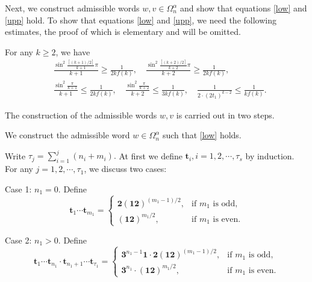 \documentclass[reqno,11pt,graphicx,]{amsart}
\numberwithin{equation}{section}
\theoremstyle{plain}
\newcommand{\3}{\mathbf{3}}
\begin{document}
	Next, we construct admissible words $w,v\in\Omega^{\alpha}_{n}$ and show that equations \eqref{low} and \eqref{upp} hold. To show that equations \eqref{low} and \eqref{upp}, we need the following estimates, the proof of which is elementary
	and will be omitted.
	
	For any $k\geq2$, we have 
	\begin{align}
		&\frac{\sin^2\frac{[(k+1)/2]}{k+1}\pi}{k+1}\geq\frac{1}{2kf(k)},\quad \frac{\sin^2\frac{[(k+2)/2]}{k+2}\pi}{k+2}\geq\frac{1}{2kf(k)},\label{imp-1}\\
		&\frac{\sin^2\frac{\pi}{k+1}}{k+1}\leq\frac{1}{2kf(k)},\quad \frac{\sin^2\frac{\pi}{k+2}}{k+2}\leq\frac{1}{3kf(k)},\quad\frac{1}{2\cdot(2t_1)^{k-2}}\leq\frac{1}{kf(k)}.\label{imp-2}
	\end{align}
	
	The construction of the admissible words $w,v$ is carried out in two steps.
	
	 We construct the admissible word $w\in\Omega^{\alpha}_{n}$ such that \eqref{low} holds. 
	
	Write $\tau_j=\sum_{i=1}^{j}(n_i+m_i).$ At first we define $\mathbf{t}_i,i =1,2,\cdots,\tau_s$ by induction. For any $j=1,2,\cdots,\tau_1$, we discuss two cases:
	
	{\rm Case 1:} $n_1=0$. Define
	\begin{equation*}
		\mathbf{t}_1\cdots \mathbf{t}_{m_1}=\begin{cases}
			\mathbf{2}(\mathbf{1}\mathbf{2})^{(m_1-1)/2},&\text{if $m_1$ is odd},\\
			(\mathbf{1}\mathbf{2})^{m_1/2},&\text{if $m_1$ is even}.
		\end{cases}
	\end{equation*}
	
	{\rm Case 2:} $n_1>0$. Define
	\begin{equation*}
		\mathbf{t}_1\cdots \mathbf{t}_{n_1}\cdot\mathbf{t}_{n_1+1}\cdots\mathbf{t}_{\tau_1}=\begin{cases}
			\mathbf{3}^{n_{1}-1}\mathbf{1}\cdot\mathbf{2}(\mathbf{1}\mathbf{2})^{(m_1-1)/2},&\text{if $m_1$ is odd},\\
			\mathbf{3}^{n_1}\cdot(\mathbf{1}\mathbf{2})^{m_1/2},&\text{if $m_1$ is even}.
		\end{cases}
	\end{equation*}
	
\end{document}
